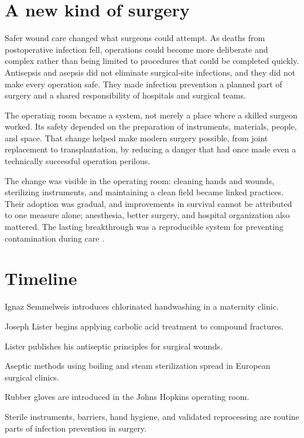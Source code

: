 \documentclass[12pt,oneside]{book}
\begin{document}
\section{A new kind of surgery}
Safer wound care changed what surgeons could attempt. As deaths from
postoperative infection fell, operations could become more deliberate and
complex rather than being limited to procedures that could be completed
quickly. Antisepsis and asepsis did not eliminate surgical-site infections,
and they did not make every operation safe. They made infection prevention
a planned part of surgery and a shared responsibility of hospitals and
surgical teams.

The operating room became a system, not merely a place where a skilled
surgeon worked. Its safety depended on the preparation of instruments,
materials, people, and space. That change helped make modern surgery
possible, from joint replacement to transplantation, by reducing a danger
that had once made even a technically successful operation perilous.

The change was visible in the operating room: cleaning hands and wounds,
sterilizing instruments, and maintaining a clean field became linked
practices. Their adoption was gradual, and improvements in survival cannot be
attributed to one measure alone; anesthesia, better surgery, and hospital
organization also mattered. The lasting breakthrough was a reproducible system
for preventing contamination during care
\cite{asepsisSchlich,cdcSterilization}.

\section*{Timeline}
\begin{description}[leftmargin=2.3cm,style=nextline]
  \item[1847] Ignaz Semmelweis introduces chlorinated handwashing in a maternity clinic.
  \item[1865] Joseph Lister begins applying carbolic acid treatment to compound fractures.
  \item[1867] Lister publishes his antiseptic principles for surgical wounds.
  \item[1880s] Aseptic methods using boiling and steam sterilization spread in European surgical clinics.
  \item[1890] Rubber gloves are introduced in the Johns Hopkins operating room.
  \item[Today] Sterile instruments, barriers, hand hygiene, and validated reprocessing are routine parts of infection prevention in surgery.
\end{description}
\end{document}
